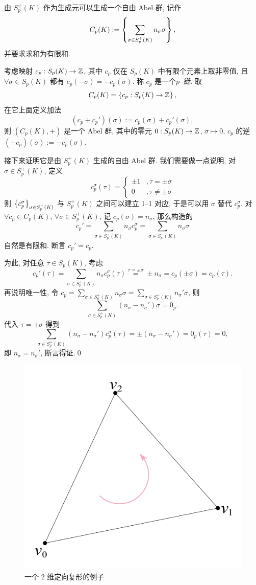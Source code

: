     \begin{Theorem}
        由 $ S_p^+(K) $ 作为生成元可以生成一个自由 Abel 群, 记作
        \[
            C_p(K):=\left\{ \sum_{\sigma\in S_p^+(K)}n_\sigma\sigma \right\},
        \]
        并要求求和为有限和.
    \end{Theorem}
    \begin{Proof}
        考虑映射 $ c_p : S_p(K)\to\mathbb{Z} $, 其中 $ c_p $ 仅在 $ S_p(K) $ 中有限个元素上取非零值, 且 $ \forall\sigma\in S_p(K) $ 都有 $ c_p(-\sigma)=-c_p(\sigma) $. 称 $ c_p $ 是一个\emph{$ p $--链}. 取
        \[
            C_p(K)=\left\{ c_p : S_p(K)\to\mathbb{Z} \right\},
        \]
        在它上面定义加法
        \[
            (c_p+c_p')(\sigma):=c_p(\sigma)+c_p'(\sigma),
        \]
        则 $ (C_p(K),+) $ 是一个 Abel 群, 其中的零元 $ 0 : S_p(K)\to\mathbb{Z} $, $ \sigma\mapsto 0 $, $ c_p $ 的逆 $ (-c_p)(\sigma):=-c_p(\sigma) $.

        接下来证明它是由 $ S_p^+(K) $ 生成的自由 Abel 群. 我们需要做一点说明, 对 $ \sigma\in S_p^+(K) $, 定义
        \[
            c_p^\sigma(\tau)=\begin{cases}
                \pm 1 & ,\tau=\pm\sigma \\ 0 & ,\tau\ne\pm\sigma
            \end{cases}
        \]
        则 $ \left\{ c_p^\sigma \right\}_{\sigma\in S_p^+(K)} $ 与 $ S_p^+(K) $ 之间可以建立 1--1 对应, 于是可以用 $ \sigma $ 替代 $ c_p^{\sigma} $. 对 $ \forall c_p\in C_p(K) $, $ \forall \sigma\in S_p^+(K) $, 记 $ c_p(\sigma)=n_\sigma $, 那么构造的
        \[
            c_p'=\sum_{\sigma\in S_p^+(K)}n_\sigma c_p^\sigma=\sum_{\sigma\in S_p^+(K)}n_\sigma\sigma
        \]
        自然是有限和. 断言 $ c_p'=c_p $.

        为此, 对任意 $ \tau\in S_p(K) $, 考虑
        \[
            c_p'(\tau)=\sum_{\sigma\in S_p^+(K)}n_\sigma c_p^\sigma(\tau)\stackrel{\tau=\pm\sigma}{=}\pm n_\sigma=c_p(\pm\sigma)=c_p(\tau).
        \]
        再说明唯一性, 令 $ c_p=\sum_{\sigma\in S_p^+(K)}n_\sigma \sigma=\sum_{\sigma\in S_p^+(K)}n_\sigma'\sigma $, 则
        \[
            \sum_{\sigma\in S_p^+(K)}(n_\sigma-n_\sigma')\sigma=0_p.
        \]
        代入 $ \tau=\pm\sigma $ 得到
        \[
            \sum_{\sigma\in S_p^+(K)}(n_\sigma-n_\sigma')c_p^\sigma(\tau)=\pm(n_\sigma-n_\sigma')=0_p(\tau)=0,
        \]
        即 $ n_\sigma=n_\sigma' $, 断言得证.\qed
    \end{Proof}

	\begin{figure}[htbp]
		\centering
        \includegraphics[width=0.3\linewidth]{figures/Sec3-2.png}
		\caption{一个 2 维定向复形的例子}
	\end{figure}

